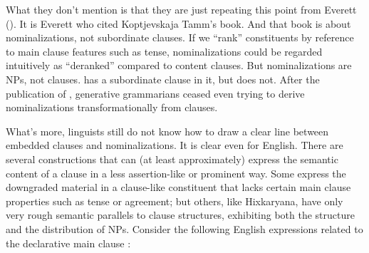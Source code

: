 \documentclass[output=paper,colorlinks,citecolor=brown
]{langscibook}
\begin{document}
What they don't mention is that they are just repeating this point
from Everett (\citeyear[629]{Everett05}). It is Everett who cited
Koptjevskaja Tamm's book. And that book is about nominalizations, not
subordinate clauses. If we ``rank'' constituents by reference to main
clause features such as tense, nominalizations could be regarded
intuitively as ``deranked'' compared to content clauses. But
nominalizations are NPs, not clauses.  has a subordinate clause in it, but
 does
not. After the publication of \citet{Chomsky70}, generative
grammarians ceased even trying to derive nominalizations
transformationally from clauses.

What's more, linguists still do not know how to draw a clear line between
embedded clauses and nominalizations. It is clear even for English.
There are several constructions that can (at least approximately)
express the semantic content of a clause in a less assertion-like
or prominent way.
Some express the downgraded material in a clause-like constituent
that lacks certain main clause properties such as tense or agreement;
but others, like Hixkaryana, have only very rough semantic parallels
to clause structures, exhibiting both the structure and the distribution
of NPs.  Consider the following English expressions related to the
declarative main clause :
\end{document}
